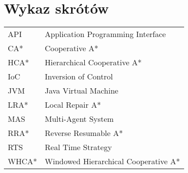 \chapter*{Wykaz skrótów}

\begin{tabular}{l l}
API & Application Programming Interface \\
CA* & Cooperative A* \\
HCA* & Hierarchical Cooperative A* \\
IoC & Inversion of Control \\
JVM & Java Virtual Machine \\
LRA* & Local Repair A* \\
MAS & Multi-Agent System \\
RRA* & Reverse Resumable A* \\
RTS & Real Time Strategy \\
WHCA* & Windowed Hierarchical Cooperative A* \\

\end{tabular}

